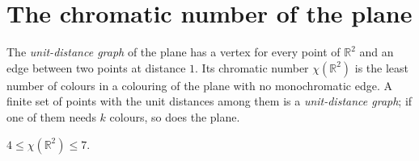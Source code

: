 \section{The chromatic number of the plane}

The \emph{unit-distance graph} of the plane has a vertex for every point of $\mathbb R^2$ and an edge between two points at distance $1$. Its chromatic
number $\chi(\mathbb R^2)$ is the least number of colours in a colouring of the plane with no monochromatic edge. A finite set of points with the unit
distances among them is a \emph{unit-distance graph}; if one of them needs $k$ colours, so does the plane.

\begin{theorem}\label{conjectures:thm:hn}
$4\le\chi(\mathbb R^2)\le7$.
\end{theorem}
